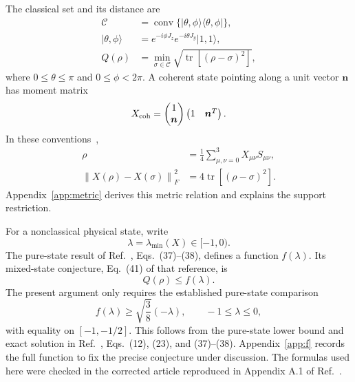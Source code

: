 \documentclass[aps,pra,reprint,amsmath,amssymb,superscriptaddress,longbibliography]{revtex4-2}
\newcommand{\tr}{\operatorname{tr}}
\newcommand{\Ccal}{\mathcal C}
\newcommand{\norm}[1]{\left\lVert #1\right\rVert}
\newcommand{\ket}[1]{\lvert #1\rangle}
\newcommand{\bra}[1]{\langle #1\rvert}
\begin{document}
The classical set and its distance are
\begin{align}
 \Ccal&=\operatorname{conv}\{\ket{\theta,\phi}\bra{\theta,\phi}\},\nonumber\\
 \ket{\theta,\phi}&=e^{-i\phi J_z}e^{-i\theta J_y}\ket{1,1},\nonumber\\
 Q(\rho)&=\min_{\sigma\in\Ccal}
       \sqrt{\tr[(\rho-\sigma)^2]},
 \label{eq:distance}
\end{align}
where \(0\leq\theta\leq\pi\) and \(0\leq\phi<2\pi\). A coherent state pointing along a unit vector \(\bm n\) has moment matrix
\begin{equation}
 X_{\rm coh}=\begin{pmatrix}1\\ \bm n\end{pmatrix}
                  \begin{pmatrix}1&\bm n^T\end{pmatrix}.
 \label{eq:coherent}
\end{equation}
In these conventions~\cite{Bohnet2016},
\begin{align}
 \rho&=\frac14\sum_{\mu,\nu=0}^3X_{\mu\nu}S_{\mu\nu},
 \nonumber\\
 \norm{X(\rho)-X(\sigma)}_F^2
       &=4\tr[(\rho-\sigma)^2].
 \label{eq:metric}
\end{align}
Appendix~\ref{app:metric} derives this metric relation and explains the support restriction.

For a nonclassical physical state, write
\begin{equation}
 \lambda=\lambda_{\min}(X)\in[-1,0).
\end{equation}
The pure-state result of Ref.~\cite{Bohnet2016}, Eqs.~(37)--(38), defines a function \(f(\lambda)\). Its mixed-state conjecture, Eq.~(41) of that reference, is
\begin{equation}
 Q(\rho)\leq f(\lambda).
 \label{eq:conjecture}
\end{equation}
The present argument only requires the established pure-state comparison
\begin{equation}
 f(\lambda)\geq\sqrt{\frac38}(-\lambda),
 \qquad -1\leq\lambda\leq0,
 \label{eq:fcomparison}
\end{equation}
with equality on \([-1,-1/2]\). This follows from the pure-state lower bound and exact solution in Ref.~\cite{Bohnet2016}, Eqs.~(12), (23), and (37)--(38). Appendix~\ref{app:f} records the full function to fix the precise conjecture under discussion. The formulas used here were checked in the corrected article reproduced in Appendix A.1 of Ref.~\cite{BohnetThesis2017}.
\end{document}
